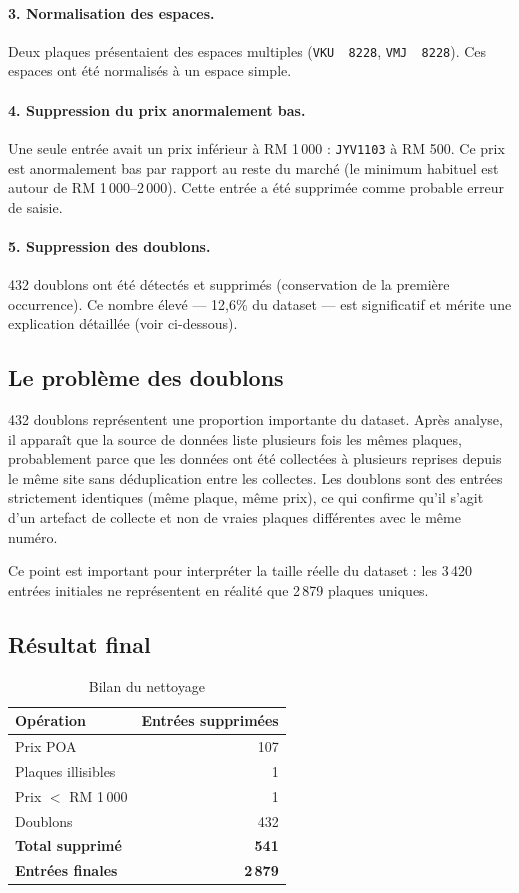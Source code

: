 \documentclass[12pt, a4paper]{article}
\begin{document}
\paragraph{3. Normalisation des espaces.}
Deux plaques présentaient des espaces multiples (\texttt{VKU~~8228}, \texttt{VMJ~~8228}). Ces espaces ont été normalisés à un espace simple.

\paragraph{4. Suppression du prix anormalement bas.}
Une seule entrée avait un prix inférieur à RM 1\,000 : \texttt{JYV1103} à RM 500. Ce prix est anormalement bas par rapport au reste du marché (le minimum habituel est autour de RM 1\,000--2\,000). Cette entrée a été supprimée comme probable erreur de saisie.

\paragraph{5. Suppression des doublons.}
432 doublons ont été détectés et supprimés (conservation de la première occurrence). Ce nombre élevé — 12,6\% du dataset — est significatif et mérite une explication détaillée (voir ci-dessous).

\subsection{Le problème des doublons}

432 doublons représentent une proportion importante du dataset. Après analyse, il apparaît que la source de données liste plusieurs fois les mêmes plaques, probablement parce que les données ont été collectées à plusieurs reprises depuis le même site sans déduplication entre les collectes. Les doublons sont des entrées strictement identiques (même plaque, même prix), ce qui confirme qu'il s'agit d'un artefact de collecte et non de vraies plaques différentes avec le même numéro.

Ce point est important pour interpréter la taille réelle du dataset : les 3\,420 entrées initiales ne représentent en réalité que 2\,879 plaques uniques.

\subsection{Résultat final}

\begin{table}[H]
\centering
\begin{tabular}{lr}
\toprule
\textbf{Opération} & \textbf{Entrées supprimées} \\
\midrule
Prix POA & 107 \\
Plaques illisibles & 1 \\
Prix $<$ RM 1\,000 & 1 \\
Doublons & 432 \\
\midrule
\textbf{Total supprimé} & \textbf{541} \\
\textbf{Entrées finales} & \textbf{2\,879} \\
\bottomrule
\end{tabular}
\caption{Bilan du nettoyage}
\end{table}
\end{document}
